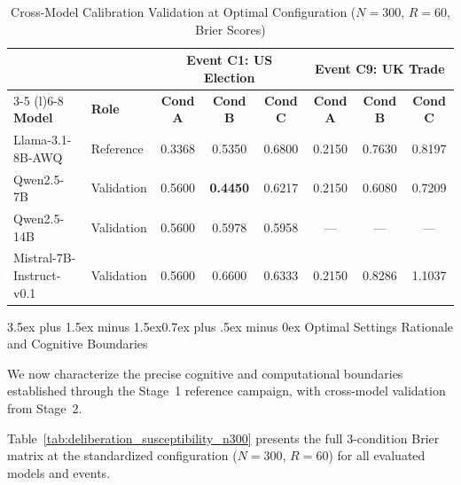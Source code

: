 \documentclass[11pt,journal,onecolumn]{IEEEtran}
\makeatletter
\renewcommand\subsection{\@startsection{subsection}{2}{\z@}%
  {3.5ex plus 1.5ex minus 1.5ex}{0.7ex plus .5ex minus 0ex}%
  {\normalfont\normalsize\bfseries}}
\makeatother
\begin{document}
\begin{table}[!htbp]
\centering
\caption{Cross-Model Calibration Validation at Optimal Configuration ($N=300$, $R=60$, Brier Scores)}
\label{tab:cross_model_results}
\begin{tabular}{llcccccc}
\toprule
 & & \multicolumn{3}{c}{\textbf{Event C1: US Election}} & \multicolumn{3}{c}{\textbf{Event C9: UK Trade}} \\
\cmidrule(r){3-5} \cmidrule(l){6-8}
\textbf{Model} & \textbf{Role} & \textbf{Cond A} & \textbf{Cond B} & \textbf{Cond C} & \textbf{Cond A} & \textbf{Cond B} & \textbf{Cond C} \\
\midrule
Llama-3.1-8B-AWQ  & Reference  & 0.3368 & 0.5350 & 0.6800 & 0.2150 & 0.7630 & 0.8197 \\
Qwen2.5-7B    & Validation & 0.5600 & \textbf{0.4450} & 0.6217 & 0.2150 & 0.6080 & 0.7209 \\
Qwen2.5-14B   & Validation & 0.5600 & 0.5978 & 0.5958 & ---   & ---   & ---   \\
Mistral-7B-Instruct-v0.1    & Validation & 0.5600 & 0.6600 & 0.6333 & 0.2150 & 0.8286 & 1.1037 \\
\bottomrule
\end{tabular}
\setlength{\tabcolsep}{6pt}
\end{table}

\subsection{Optimal Settings Rationale and Cognitive Boundaries}
\label{sec:optimal_bounds}

We now characterize the precise cognitive and computational boundaries established through the Stage~1 reference campaign, with cross-model validation from Stage~2.

Table~\ref{tab:deliberation_susceptibility_n300} presents the full 3-condition Brier matrix at the standardized configuration ($N=300$, $R=60$) for all evaluated models and events.
\end{document}
